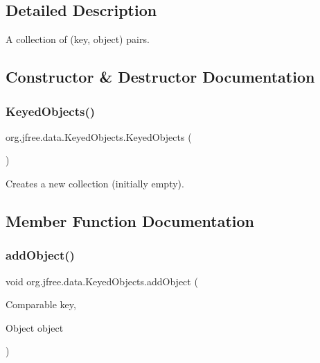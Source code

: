 \subsection{Detailed Description}
A collection of (key, object) pairs. 

\subsection{Constructor \& Destructor Documentation}
\mbox{\label{classorg_1_1jfree_1_1data_1_1_keyed_objects_a06f563fe73c745456393b466ea13d743}} 
\subsubsection{\texorpdfstring{Keyed\+Objects()}{KeyedObjects()}}
{\footnotesize\ttfamily org.\+jfree.\+data.\+Keyed\+Objects.\+Keyed\+Objects (\begin{DoxyParamCaption}{ }\end{DoxyParamCaption})}

Creates a new collection (initially empty). 

\subsection{Member Function Documentation}
\mbox{\label{classorg_1_1jfree_1_1data_1_1_keyed_objects_a6a48961294a54e5a2d1c64489ab52cf6}} 
\subsubsection{\texorpdfstring{add\+Object()}{addObject()}}
{\footnotesize\ttfamily void org.\+jfree.\+data.\+Keyed\+Objects.\+add\+Object (\begin{DoxyParamCaption}\item[{Comparable}]{key,  }\item[{Object}]{object }\end{DoxyParamCaption})}

